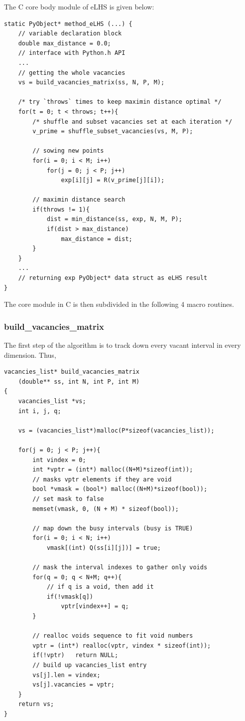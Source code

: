 \documentclass[12pt]{extarticle}
\begin{document}
The C core body module of eLHS is given below:
\begin{lstlisting}[style=CStyle]
static PyObject* method_eLHS (...) {
	// variable declaration block
    double max_distance = 0.0;
	// interface with Python.h API
	...
	// getting the whole vacancies 
    vs = build_vacancies_matrix(ss, N, P, M);

	/* try `throws` times to keep maximin distance optimal */
    for(t = 0; t < throws; t++){
        /* shuffle and subset vacancies set at each iteration */
        v_prime = shuffle_subset_vacancies(vs, M, P);
        
        // sowing new points
        for(i = 0; i < M; i++)
            for(j = 0; j < P; j++)
                exp[i][j] = R(v_prime[j][i]);
        
	    // maximin distance search 
        if(throws != 1){
            dist = min_distance(ss, exp, N, M, P);
            if(dist > max_distance)
                max_distance = dist;
        }
    }
    ...
	// returning exp PyObject* data struct as eLHS result
}
\end{lstlisting}


The core module in C is then subdivided in the following 4 macro routines. 

\subsubsection{build{\_}vacancies{\_}matrix}
The first step of the algorithm is to track down every vacant interval in every dimension. Thus, 

\begin{lstlisting}[style=CStyle]
vacancies_list* build_vacancies_matrix
	(double** ss, int N, int P, int M)
{
    vacancies_list *vs;
    int i, j, q;

    vs = (vacancies_list*)malloc(P*sizeof(vacancies_list));

    for(j = 0; j < P; j++){
        int vindex = 0;
        int *vptr = (int*) malloc((N+M)*sizeof(int));
        // masks vptr elements if they are void 
        bool *vmask = (bool*) malloc((N+M)*sizeof(bool));   
        // set mask to false 
        memset(vmask, 0, (N + M) * sizeof(bool));           
        
        // map down the busy intervals (busy is TRUE)
        for(i = 0; i < N; i++)
            vmask[(int) Q(ss[i][j])] = true;
        
        // mask the interval indexes to gather only voids
        for(q = 0; q < N+M; q++){
            // if q is a void, then add it
            if(!vmask[q])   
                vptr[vindex++] = q;
        }

        // realloc voids sequence to fit void numbers
        vptr = (int*) realloc(vptr, vindex * sizeof(int));
        if(!vptr)   return NULL;
        // build up vacancies_list entry
        vs[j].len = vindex;
        vs[j].vacancies = vptr;
    }
    return vs;
}
\end{lstlisting}
\end{document}
